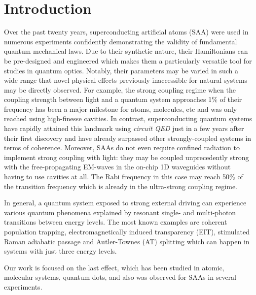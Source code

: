 \documentclass[%
 aip,
 amsmath,amssymb,
 reprint,%
]{revtex4-1}
\begin{document}
\section{Introduction}
Over the past twenty years, superconducting artificial atoms (SAA) were used in numerous experiments confidently demonstrating the validity of fundamental quantum mechanical laws\cite{you2011atomic}. Due to their synthetic nature, their Hamiltonians can be pre-designed and engineered which makes them a particularly versatile tool for studies in quantum optics. Notably, their parameters may be varied in such a wide range that novel physical effects previously inaccessible for natural systems may be directly observed. For example, the strong coupling regime when the coupling strength between light and a quantum system approaches 1\% of their frequency has been a major milestone for atoms, molecules, etc and was only reached using high-finesse cavities. In contrast, superconducting quantum systems have rapidly attained this landmark using \textit{circuit QED}\cite{wallraff2004strong} just in a few years after their first discovery\cite{chiorescu2004coherent} and have already surpassed other strongly-coupled systems in terms of coherence\cite{forn2019ultrastrong}. 
Moreover, SAAs do not even require confined radiation to implement strong coupling with light: they may be coupled unprecedently strong with the free-propagating EM-waves in the on-chip 1D waveguides\cite{astafiev2010resonance} without having to use cavities at all. The Rabi frequency in this case may reach 50\% of the transition frequency\cite{deng2015observation} which is already in the ultra-strong coupling regime.

In general, a quantum system exposed to strong external driving can experience various quantum phenomena explained by resonant single- and multi-photon transitions between energy levels. The most known examples are coherent population trapping, electromagnetically induced transparency (EIT)\cite{boller1991observation}, stimulated Raman adiabatic passage\cite{bergmann1998coherent} and Autler-Townes (AT) splitting\cite{autler1955stark} which can happen in systems with just three energy levels. 

Our work is focused on the last effect, which has been studied in atomic\cite{picque1976direct}, molecular systems\cite{tamarat1995pump}, quantum dots\cite{xu2007coherent}, and also was observed for SAAs in several experiments\cite{baur2009measurement, sillanpaa2009autler, novikov2013autler, suri2013observation, peng2018vacuum}.
\end{document}
